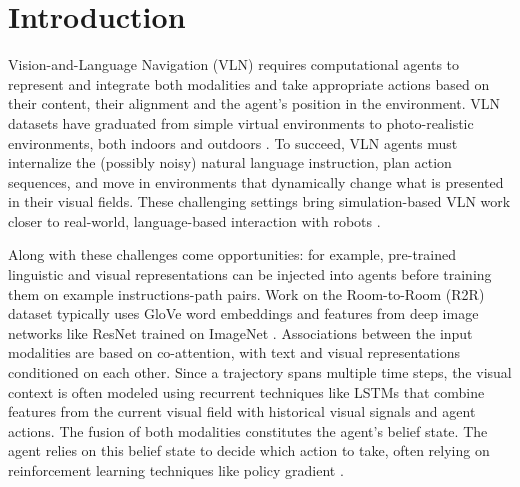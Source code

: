 \documentclass[10pt,twocolumn,letterpaper]{article}
\begin{document}
\section{Introduction}
\label{sec:introduction}

Vision-and-Language Navigation (VLN) requires computational agents to represent and integrate both modalities and take appropriate actions based on their content, their alignment and the agent's position in the environment. VLN datasets have graduated from simple virtual environments \cite{Macmahon06walkthe} to photo-realistic environments, both indoors \cite{Anderson:2018:VLN} and outdoors
\cite{deVries:2018:TalkWalk,Cirik:2018:StreetView,Hermann:2019:StreeLang}. To succeed, VLN agents must internalize the (possibly noisy) natural language instruction, plan action sequences, and move in environments that dynamically change what is presented in their visual fields. These challenging settings bring simulation-based VLN work closer to real-world, language-based interaction with robots \cite{matuszek:2018}.








Along with these challenges come opportunities: for example, pre-trained linguistic and visual representations can be injected into agents before training them on example instructions-path pairs. Work on the Room-to-Room (R2R) dataset \cite{Anderson:2018:VLN} typically uses GloVe word embeddings \cite{Pennington:2014:GloVe} and features from deep image networks like ResNet \cite{He:2016:Resnet} trained on ImageNet \cite{Russakovsky:2015:ImageNet}. Associations between the input modalities are based on co-attention, with text and visual representations conditioned on each other. Since a trajectory spans multiple time steps, the visual context is often modeled using recurrent techniques like LSTMs \cite{Hochreiter:1997:LSTM} that combine features from the current visual field with historical visual signals and agent actions. The fusion of both modalities constitutes the agent's belief state. The agent relies on this belief state to decide which action to take, often relying on reinforcement learning techniques like policy gradient \cite{Williams:1992:PolicyGradient}.
\end{document}
